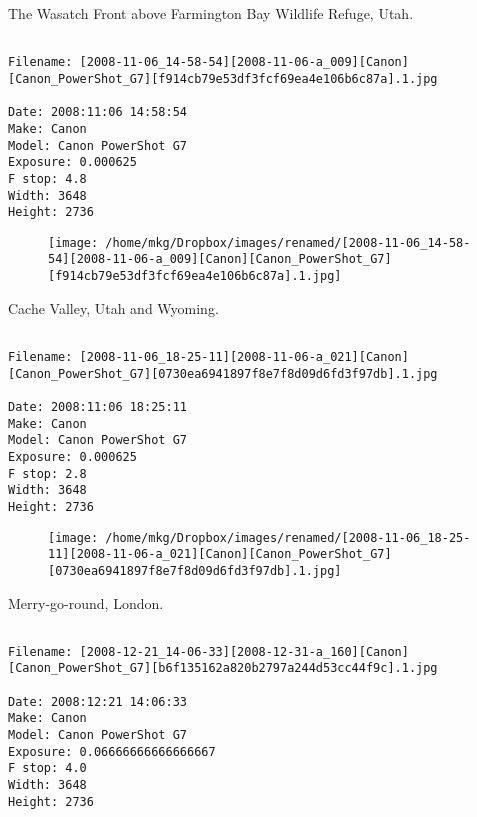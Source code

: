 \clearpage
\onecolumn
\noindent The Wasatch Front above Farmington Bay Wildlife Refuge, Utah.
\noindent
\begin{lstlisting}

Filename: [2008-11-06_14-58-54][2008-11-06-a_009][Canon][Canon_PowerShot_G7][f914cb79e53df3fcf69ea4e106b6c87a].1.jpg

Date: 2008:11:06 14:58:54
Make: Canon
Model: Canon PowerShot G7
Exposure: 0.000625
F stop: 4.8
Width: 3648
Height: 2736
\end{lstlisting}
\clearpage

\begin{figure}
\texttt{[image: /home/mkg/Dropbox/images/renamed/[2008-11-06\_14-58-54][2008-11-06-a\_009][Canon][Canon\_PowerShot\_G7][f914cb79e53df3fcf69ea4e106b6c87a].1.jpg]}
\end{figure}
    
\clearpage
\onecolumn
\noindent Cache Valley, Utah and Wyoming.
\noindent
\begin{lstlisting}

Filename: [2008-11-06_18-25-11][2008-11-06-a_021][Canon][Canon_PowerShot_G7][0730ea6941897f8e7f8d09d6fd3f97db].1.jpg

Date: 2008:11:06 18:25:11
Make: Canon
Model: Canon PowerShot G7
Exposure: 0.000625
F stop: 2.8
Width: 3648
Height: 2736
\end{lstlisting}
\clearpage

\begin{figure}
\texttt{[image: /home/mkg/Dropbox/images/renamed/[2008-11-06\_18-25-11][2008-11-06-a\_021][Canon][Canon\_PowerShot\_G7][0730ea6941897f8e7f8d09d6fd3f97db].1.jpg]}
\end{figure}
    
\clearpage
\onecolumn
\noindent Merry-go-round, London.
\noindent
\begin{lstlisting}

Filename: [2008-12-21_14-06-33][2008-12-31-a_160][Canon][Canon_PowerShot_G7][b6f135162a820b2797a244d53cc44f9c].1.jpg

Date: 2008:12:21 14:06:33
Make: Canon
Model: Canon PowerShot G7
Exposure: 0.06666666666666667
F stop: 4.0
Width: 3648
Height: 2736
\end{lstlisting}
\clearpage

